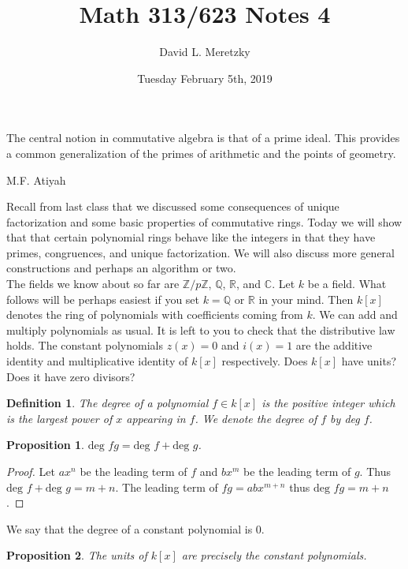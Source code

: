 \documentclass{article}
\title{ \vspace{-10ex} %
Math 313/623 Notes 4
}
\author{David L. Meretzky
}
\date{%
Tuesday February 5th, 2019
}
\theoremstyle{problemstyle}
\newtheorem{proposition}{Proposition}
\newtheorem{definition}{Definition}
\begin{document}
\maketitle

\epigraph{The central notion in commutative algebra is that of a prime ideal. This provides a common generalization of the primes of arithmetic and the points of geometry.}{M.F. Atiyah}

Recall from last class that we discussed some consequences of unique factorization and some basic properties of commutative rings. Today we will show that that certain polynomial rings behave like the integers in that they have primes, congruences, and unique factorization. We will also discuss more general constructions and perhaps an algorithm or two.\\ 

The fields we know about so far are $\mathbb{Z}/p\mathbb{Z}$, $\mathbb{Q}$, $\mathbb{R}$, and $\mathbb{C}$. Let $k$ be a field. What follows will be perhaps easiest if you set $k = \mathbb{Q}$ or $\mathbb{R}$ in your mind. Then $k[x]$ denotes the ring of polynomials with coefficients coming from $k$. We can add and multiply polynomials as usual. It is left to you to check that the distributive law holds. The constant polynomials $z(x) = 0$ and $i(x) = 1$ are the additive identity and multiplicative identity of $k[x]$ respectively. Does $k[x]$ have units? Does it have zero divisors?

\begin{definition}
The degree of a polynomial $f \in k[x]$ is the positive integer which is the largest power of $x$ appearing in $f$. We denote the degree of $f$ by deg $f$. 
\end{definition}

\begin{proposition}
$\text{deg } fg = \text{deg } f + \text{deg } g$. 
\end{proposition}

\begin{proof}
Let $ax^n$ be the leading term of $f$ and $bx^m$ be the leading term of $g$. Thus $\text{deg } f + \text{deg } g = m+n$. The leading term of $fg = abx^{m+n}$ thus  $\text{deg } fg = m+n$. 
\end{proof}

We say that the degree of a constant polynomial is $0$. 

\begin{proposition}
The units of $k[x]$ are precisely the constant polynomials. 
\end{proposition}
\end{document}
